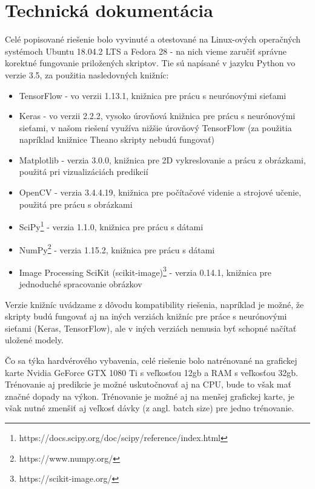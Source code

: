 \newpage
\section{Technická dokumentácia}
\label{technical_doc}

Celé popisované riešenie bolo vyvinuté a otestované na Linux-ových operačných systémoch Ubuntu 18.04.2 LTS a Fedora 28 - na nich vieme  zaručiť správne korektné fungovanie priložených skriptov. Tie sú napísané v jazyku Python vo verzie 3.5, za použitia nasledovných knižníc:

\begin{itemize}
	\item TensorFlow - vo verzii 1.13.1, knižnica pre prácu s neurónovými sieťami 
	\item Keras - vo verzii 2.2.2, vysoko úrovňová knižnica pre prácu s neurónovými sieťami, v našom riešení využíva nižšie úrovňový TensorFlow (za použitia napríklad knižnice Theano skripty nebudú fungovať)
	\item Matplotlib - verzia 3.0.0, knižnica pre 2D vykreslovanie a prácu z obrázkami, použitá pri vizualizáciách predikcií
	\item OpenCV - verzia 3.4.4.19, knižnica pre počítačové videnie a strojové učenie, použitá pre prácu s obrázkami
	\item SciPy\footnote{https://docs.scipy.org/doc/scipy/reference/index.html} - verzia 1.1.0, knižnica pre prácu s dátami
	\item NumPy\footnote{https://www.numpy.org/} - verzia 1.15.2, knižnica pre prácu s dátami
	\item Image Processing SciKit (scikit-image)\footnote{https://scikit-image.org/} - verzia 0.14.1, knižnica pre jednoduché spracovanie obrázkov
\end{itemize}

Verzie knižníc uvádzame z dôvodu kompatibility riešenia, napríklad je možné, že skripty budú fungovať aj na iných verziách knižníc pre práce s neurónovými sieťami (Keras, TensorFlow), ale v iných verziách nemusia byť schopné načítať uložené modely. 

Čo sa týka hardvérového vybavenia, celé riešenie bolo natrénované na grafickej karte Nvidia GeForce GTX 1080 Ti s veľkosťou 12gb a RAM s veľkosťou 32gb. Trénovanie aj predikcie je možné uskutočnovať aj na CPU, bude to však mať značné dopady na výkon. Trénovanie je možné aj na menšej grafickej karte, je však nutné zmenšiť aj veľkosť dávky (z angl. batch size) pre jedno trénovanie.

